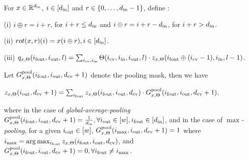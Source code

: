 \begin{definition}
For $x\in\mathbb{R}^{d_{\text{in}}}$, $i\in[d_{\text{in}}]$ and $r\in\{0,\ldots,d_{\text{in}}-1\}$, define :

(i) $i\oplus r = i+r$, for $i+r \leq d_{\text{in}}$ and $i\oplus r =i+r-d_{\text{in}}$, for $i+r>d_{\text{in}}$.

(ii) $rot(x,r)(i)=x(i\oplus r), i\in[d_{\text{in}}]$.

(iii) $q_{x,\Theta}(i_{\text{fout}},i_{\text{out}},l)=\sum_{i_{\text{cv}},i_{\text{in}}}\Theta(i_{\text{cv}},i_{\text{in}},i_{\text{out}},l)\cdot z_{x,\Theta}(i_{\text{fout}}\oplus (i_{\text{cv}}-1),i_{\text{in}},l-1)$. 
\end{definition}
\begin{definition}[Pooling]\label{def:pooling}
Let $G^{\text{pool}}_{x,\Theta}(i_{\text{fout}},i_{\text{out}},d_{\text{cv}}+1)$ denote the pooling mask, then we have
\centerline{
$z_{x,\Theta}(i_{\text{out}}, d_{\text{cv}}+1) =\sum_{i_{\text{fout}}} z_{x,\Theta}(i_{\text{fout}},i_{\text{out}},d_{\text{cv}})\cdot G^{\text{pool}}_{x,\Theta}(i_{\text{fout}},i_{\text{out}},d_{\text{cv}}+1),$
}
where in the case of \emph{global-average-pooling} $G^{\text{pool}}_{x,\Theta}(i_{\text{fout}},i_{\text{out}},d_{\text{cv}}+1)=\frac{1}{d_{\text{in}}},\forall i_{\text{out}}\in[w], i_{\text{fout}}\in[d_{\text{in}}]$, and in the case of \emph{$\max$-pooling},  
for a given $i_{\text{out}}\in[w]$, $G^{\text{pool}}_{x,\Theta}(i_{\max},i_{\text{out}},d_{\text{cv}}+1)=1$ where $i_{\max}=\arg\max_{i_{\text{fout}}}z_{x,\Theta}(i_{\text{fout}},i_{\text{out}},d_{\text{cv}})$, and $G^{\text{pool}}_{x,\Theta}(i_{\text{fout}},i_{\text{out}},d_{\text{cv}}+1)=0,\forall i_{\text{fout}}\neq i_{\max}$.
\end{definition}

